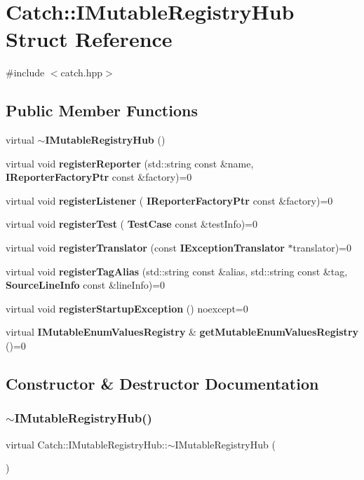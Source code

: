 \section{Catch\+::I\+Mutable\+Registry\+Hub Struct Reference}
\label{struct_catch_1_1_i_mutable_registry_hub}


{\ttfamily \#include $<$catch.\+hpp$>$}

\subsection*{Public Member Functions}
\begin{DoxyCompactItemize}
\item 
virtual \textbf{ $\sim$\+I\+Mutable\+Registry\+Hub} ()
\item 
virtual void \textbf{ register\+Reporter} (std\+::string const \&name, \textbf{ I\+Reporter\+Factory\+Ptr} const \&factory)=0
\item 
virtual void \textbf{ register\+Listener} (\textbf{ I\+Reporter\+Factory\+Ptr} const \&factory)=0
\item 
virtual void \textbf{ register\+Test} (\textbf{ Test\+Case} const \&test\+Info)=0
\item 
virtual void \textbf{ register\+Translator} (const \textbf{ I\+Exception\+Translator} $\ast$translator)=0
\item 
virtual void \textbf{ register\+Tag\+Alias} (std\+::string const \&alias, std\+::string const \&tag, \textbf{ Source\+Line\+Info} const \&line\+Info)=0
\item 
virtual void \textbf{ register\+Startup\+Exception} () noexcept=0
\item 
virtual \textbf{ I\+Mutable\+Enum\+Values\+Registry} \& \textbf{ get\+Mutable\+Enum\+Values\+Registry} ()=0
\end{DoxyCompactItemize}


\subsection{Constructor \& Destructor Documentation}
\mbox{\label{struct_catch_1_1_i_mutable_registry_hub_a759ca1e044e19f905fb4d306f1367193}} 
\subsubsection{$\sim$IMutableRegistryHub()}
{\footnotesize\ttfamily virtual Catch\+::\+I\+Mutable\+Registry\+Hub\+::$\sim$\+I\+Mutable\+Registry\+Hub (\begin{DoxyParamCaption}{ }\end{DoxyParamCaption})\hspace{0.3cm}{\ttfamily [virtual]}}



